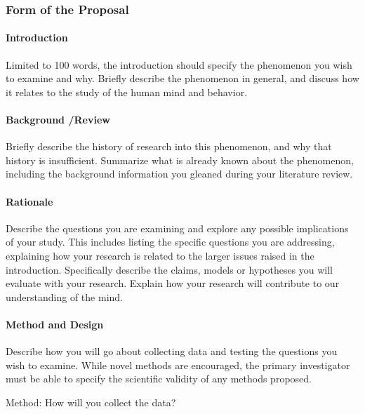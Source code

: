 {{\subsubsection{Form of the Proposal}
\label{formoftheproposal}

\paragraph{Introduction}
\label{introduction}

Limited to 100 words, the introduction should specify the phenomenon you wish to examine and why. Briefly describe the phenomenon in general, and discuss how it relates to the study of the human mind and behavior.

\paragraph{Background \slash  Review}
\label{backgroundreview}

Briefly describe the history of research into this phenomenon, and why that history is insufficient. Summarize what is already known about the phenomenon, including the background information you gleaned during your literature review.

\paragraph{Rationale}
\label{rationale}

Describe the questions you are examining and explore any possible implications of your study. This includes listing the specific questions you are addressing, explaining how your research is related to the larger issues raised in the introduction. Specifically describe the claims, models or hypotheses you will evaluate with your research. Explain how your research will contribute to our understanding of the mind.

\paragraph{Method and Design}
\label{methodanddesign}

Describe how you will go about collecting data and testing the questions you wish to examine. While novel methods are encouraged, the primary investigator must be able to specify the scientific validity of any methods proposed.

Method: How will you collect the data?

}}
